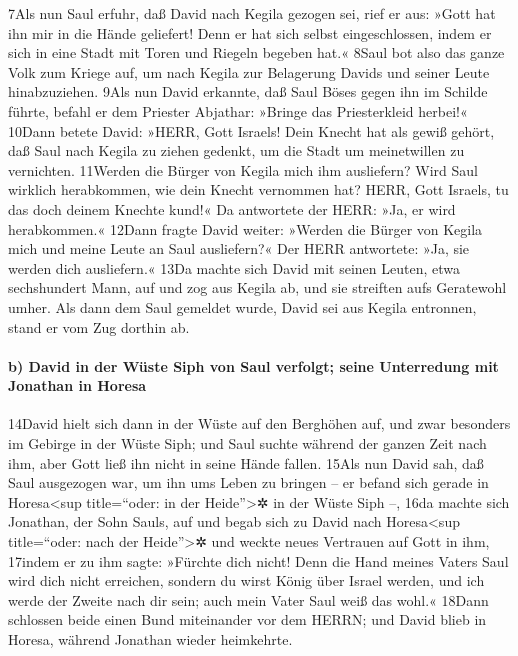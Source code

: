 7Als nun Saul erfuhr, daß David nach Kegila gezogen sei, rief er aus:
»Gott hat ihn mir in die Hände geliefert! Denn er hat sich selbst
eingeschlossen, indem er sich in eine Stadt mit Toren und Riegeln
begeben hat.« 8Saul bot also das ganze Volk zum Kriege auf, um nach
Kegila zur Belagerung Davids und seiner Leute hinabzuziehen. 9Als nun
David erkannte, daß Saul Böses gegen ihn im Schilde führte, befahl er
dem Priester Abjathar: »Bringe das Priesterkleid herbei!« 10Dann betete
David: »HERR, Gott Israels! Dein Knecht hat als gewiß gehört, daß Saul
nach Kegila zu ziehen gedenkt, um die Stadt um meinetwillen zu
vernichten. 11Werden die Bürger von Kegila mich ihm ausliefern? Wird
Saul wirklich herabkommen, wie dein Knecht vernommen hat? HERR, Gott
Israels, tu das doch deinem Knechte kund!« Da antwortete der HERR: »Ja,
er wird herabkommen.« 12Dann fragte David weiter: »Werden die Bürger von
Kegila mich und meine Leute an Saul ausliefern?« Der HERR antwortete:
»Ja, sie werden dich ausliefern.« 13Da machte sich David mit seinen
Leuten, etwa sechshundert Mann, auf und zog aus Kegila ab, und sie
streiften aufs Geratewohl umher. Als dann dem Saul gemeldet wurde, David
sei aus Kegila entronnen, stand er vom Zug dorthin ab.

\hypertarget{b-david-in-der-wuxfcste-siph-von-saul-verfolgt-seine-unterredung-mit-jonathan-in-horesa}{%
\paragraph{b) David in der Wüste Siph von Saul verfolgt; seine
Unterredung mit Jonathan in
Horesa}\label{b-david-in-der-wuxfcste-siph-von-saul-verfolgt-seine-unterredung-mit-jonathan-in-horesa}}

14David hielt sich dann in der Wüste auf den Berghöhen auf, und zwar
besonders im Gebirge in der Wüste Siph; und Saul suchte während der
ganzen Zeit nach ihm, aber Gott ließ ihn nicht in seine Hände fallen.
15Als nun David sah, daß Saul ausgezogen war, um ihn ums Leben zu
bringen -- er befand sich gerade in Horesa\textless sup title=``oder: in
der Heide''\textgreater✲ in der Wüste Siph --, 16da machte sich
Jonathan, der Sohn Sauls, auf und begab sich zu David nach
Horesa\textless sup title=``oder: nach der Heide''\textgreater✲ und
weckte neues Vertrauen auf Gott in ihm, 17indem er zu ihm sagte:
»Fürchte dich nicht! Denn die Hand meines Vaters Saul wird dich nicht
erreichen, sondern du wirst König über Israel werden, und ich werde der
Zweite nach dir sein; auch mein Vater Saul weiß das wohl.« 18Dann
schlossen beide einen Bund miteinander vor dem HERRN; und David blieb in
Horesa, während Jonathan wieder heimkehrte.

